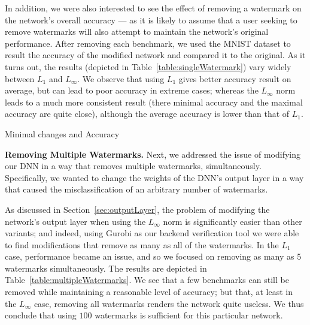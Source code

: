 \documentclass{easychair}
\begin{document}
In addition, we were also interested to see the effect of removing a
watermark on the network's overall accuracy --- as it is likely to
assume that a user seeking to remove watermarks will also attempt to
maintain the network's original performance. After removing each
benchmark, we used the MNIST dataset to result the accuracy of the
modified network and compared it to the original. As it turns out, the
results (depicted in Table~\ref{table:singleWatermark})
vary widely between $L_1$ and $L_\infty$. We observe that using 
$L_1$ gives better accuracy result on average, but can lead to poor
accuracy in extreme cases; whereas the $L_\infty$ norm leads to a much
more consistent result (there minimal accuracy and the maximal
accuracy are quite close), although the average accuracy is lower than
that of $L_1$. 

\begin{table}
\caption{Minimal changes and Accuracy}
\label{table:singleWatermark}
\end{table}

\medskip\noindent \textbf{Removing Multiple Watermarks.}
Next, we addressed the issue of modifying our DNN in a way that
removes multiple watermarks, simultaneously. Specifically, we wanted
to change the weights of the DNN's output layer in a way that caused
the misclassification of an arbitrary number of watermarks.

As discussed in Section~\ref{sec:outputLayer}, the problem of modifying the network's
output layer when using the $L_\infty$ norm is significantly easier
than other variants; and indeed, using Gurobi as our backend
verification tool we were able to find modifications
that remove as many as all of the watermarks. In the $L_1$ case,
performance became an issue, and so we focused on removing as many as
5 watermarks simultaneously. The results are depicted in
Table~\ref{table:multipleWatermarks}. We see that a few benchmarks can
still be removed while maintaining a reasonable level of accuracy; but
that, at least in the $L_\infty$ case, removing all watermarks renders
the network quite useless. We thus conclude that using $100$
watermarks is sufficient for this particular network.
\end{document}
